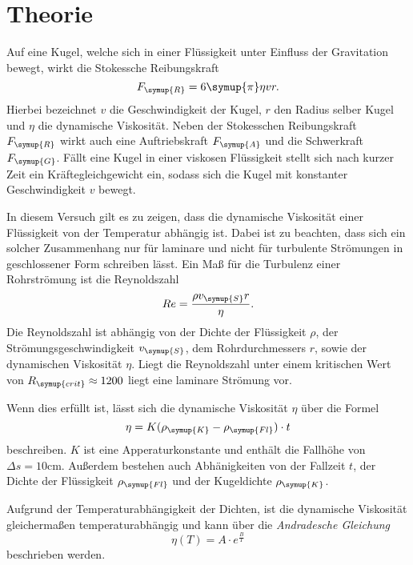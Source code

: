 \section{Theorie}
\label{sec:Theorie}
Auf eine Kugel, welche sich in einer Flüssigkeit unter Einfluss der Gravitation bewegt, wirkt die Stokessche Reibungskraft
\begin{equation}
    F_{\symup{R}}=6\symup{\pi}\eta v r.
\end{equation}
Hierbei bezeichnet $v$ die Geschwindigkeit der Kugel, $r$ den Radius selber Kugel und $\eta$ die dynamische Viskosität.
Neben der Stokesschen Reibungskraft $F_{\symup{R}}$ wirkt auch eine Auftriebskraft $F_{\symup{A}}$ und die Schwerkraft $F_{\symup{G}}$.
Fällt eine Kugel in einer viskosen Flüssigkeit stellt sich nach kurzer Zeit ein Kräftegleichgewicht ein, sodass sich die Kugel 
mit konstanter Geschwindigkeit $v$ bewegt.

In diesem Versuch gilt es zu zeigen, dass die dynamische Viskosität einer Flüssigkeit von der Temperatur abhängig ist. 
Dabei ist zu beachten, dass sich ein solcher Zusammenhang nur für laminare
und nicht für turbulente Strömungen in geschlossener Form schreiben lässt. Ein Maß für die Turbulenz einer Rohrströmung ist die Reynoldszahl
\begin{equation}
    Re=\frac{\rho v_{\symup{S}}r}{\eta}.
    \label{eqn:Reynoldszahl}
\end{equation}
Die Reynoldszahl ist abhängig von der Dichte der Flüssigkeit $\rho$, der Strömungsgeschwindigkeit $v_{\symup{S}}$, dem 
Rohrdurchmessers $r$, sowie der dynamischen Viskosität $\eta$. Liegt die Reynoldszahl unter einem kritischen Wert von
$R_{\symup{crit}}\approx 1200$ \cite[341/B102]{czichos} liegt eine laminare Strömung vor.

Wenn dies erfüllt ist, lässt sich die dynamische Viskosität $\eta$ über die Formel
\begin{equation}
    \eta = K(\rho_{\symup{K}}-\rho_{\symup{Fl}})\cdot t
    \label{eqn:Viskosität}
\end{equation}
beschreiben. $K$ ist eine Apperaturkonstante und enthält die Fallhöhe von $\Delta s=10\unit{\centi\metre}$. Außerdem
bestehen auch Abhänigkeiten von der Fallzeit $t$, der Dichte der Flüssigkeit $\rho_{\symup{Fl}}$ und der Kugeldichte
$\rho_{\symup{K}}$.

Aufgrund der Temperaturabhängigkeit der Dichten, ist die dynamische Viskosität gleichermaßen temperaturabhängig und kann über 
die \textit{Andradesche Gleichung}
\begin{equation}
    \eta (T)=A\cdot e^{\frac{B}{T}}
    \label{eqn:Andradesche Gleichung}
\end{equation}
beschrieben werden.

